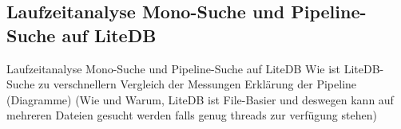 \subsection{Laufzeitanalyse Mono-Suche und Pipeline-Suche auf LiteDB} \label{subsec:Laufzeitanalyse}
Laufzeitanalyse Mono-Suche und Pipeline-Suche auf LiteDB
Wie ist LiteDB-Suche zu verschnellern
Vergleich der Messungen
Erklärung der Pipeline (Diagramme) (Wie und Warum, LiteDB ist File-Basier und deswegen kann auf mehreren Dateien gesucht werden falls genug threads zur verfügung stehen)
